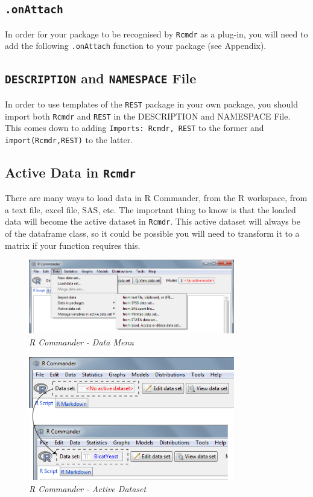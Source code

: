 \documentclass[a4paper]{article}\usepackage[]{graphicx}\usepackage[]{color}
\begin{document}
\subsection{\texttt{.onAttach}}
\noindent In order for your package to be recognised by \texttt{Rcmdr} as a
plug-in, you will need to add the following \texttt{.onAttach} function to your
package (see Appendix).

\subsection{\texttt{DESCRIPTION} and \texttt{NAMESPACE} File}
In order to use templates of the \verb|REST| package in your own package, you
should import both \verb|Rcmdr| and \verb|REST| in the DESCRIPTION and
NAMESPACE File.\\
This comes down to adding \verb|Imports: Rcmdr, REST| to the former and
\verb|import(Rcmdr,REST)| to the latter.

\subsection{Active Data in \texttt{Rcmdr}}
There are many ways to load data in R Commander, from the R workspace, from a
text file, excel file, SAS, etc. The important thing to know is that the loaded
data will become the active dataset in \texttt{Rcmdr}. This active dataset will
always be of the dataframe class, so it could be possible you will need to
transform it to a matrix if your function requires this.

\begin{figure}[H]
\centering
\includegraphics[width=9cm]{figures/rcmdr_datainput.png}
\caption{{\it R Commander - Data Menu}\label{datainput}}
\end{figure}
\begin{figure}[H]
\centering
\includegraphics[width=9cm]{figures/rcmdr_activedataset.png}
\caption{{\it R Commander - Active Dataset}\label{activedataset}}
\end{figure}
\end{document}
